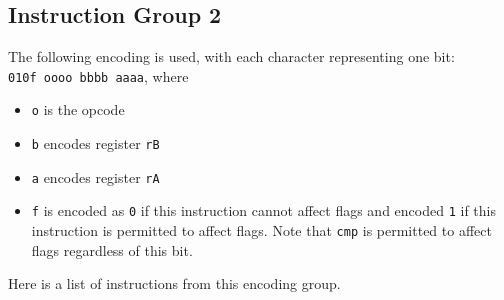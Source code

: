 \documentclass{article}
\begin{document}
\begin{itemize}
	\end{itemize}

	\doublespacing

	\subsection{Instruction Group 2}
	The following encoding is used, with each character representing one
	bit: \\
	\texttt{010f oooo bbbb aaaa}, where

	\singlespacing
	\begin{itemize}
	\item \texttt{o} is the opcode
	\item \texttt{b} encodes register \texttt{rB}
	\item \texttt{a} encodes register \texttt{rA}
	\item \texttt{f} is encoded as \texttt{0} if this instruction
	cannot affect flags and encoded \texttt{1} if this instruction is
	permitted to affect flags. Note that \texttt{cmp} is permitted to
	affect flags regardless of this bit.
	\end{itemize}
	\doublespacing

	Here is a list of instructions from this encoding group.
\end{document}
